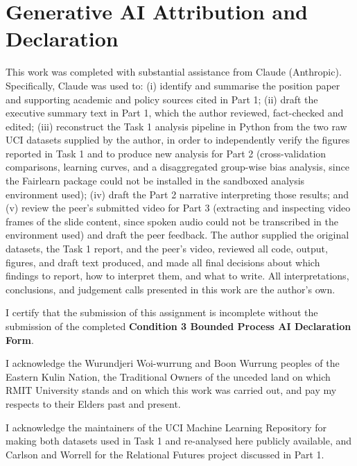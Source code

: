 \documentclass[manuscript,screen,review,nonacm]{acmart}
\begin{document}
\section*{Generative AI Attribution and Declaration}
\noindent
This work was completed with substantial assistance from Claude (Anthropic). Specifically, Claude
was used to: (i) identify and summarise the position paper and supporting academic and policy
sources cited in Part 1; (ii) draft the executive summary text in Part 1, which the author
reviewed, fact-checked and edited; (iii) reconstruct the Task 1 analysis pipeline in Python from
the two raw UCI datasets supplied by the author, in order to independently verify the figures
reported in Task 1 and to produce new analysis for Part 2 (cross-validation comparisons, learning
curves, and a disaggregated group-wise bias analysis, since the Fairlearn package could not be
installed in the sandboxed analysis environment used); (iv) draft the Part 2 narrative
interpreting those results; and (v) review the peer's submitted video for Part 3 (extracting and
inspecting video frames of the slide content, since spoken audio could not be transcribed in the
environment used) and draft the peer feedback. The author supplied the original datasets, the
Task 1 report, and the peer's video, reviewed all code, output, figures, and draft text produced,
and made all final decisions about which findings to report, how to interpret them, and what to
write. All interpretations, conclusions, and judgement calls presented in this work are the
author's own.

\noindent

I certify that the submission of this assignment is incomplete without the submission of the
completed \textbf{Condition 3 Bounded Process AI Declaration Form}.

\begin{acks}
I acknowledge the Wurundjeri Woi-wurrung and Boon Wurrung peoples of the Eastern Kulin Nation,
the Traditional Owners of the unceded land on which RMIT University stands and on which this work
was carried out, and pay my respects to their Elders past and present.

I acknowledge the maintainers of the UCI Machine Learning Repository for making both datasets
used in Task 1 and re-analysed here publicly available, and Carlson and Worrell for the
Relational Futures project discussed in Part 1.
\end{acks}




\appendix

\end{document}
